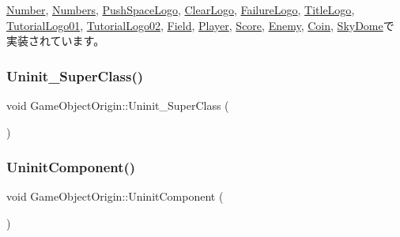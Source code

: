 \mbox{\hyperlink{class_number_a7c3bf9c55f7a0a19d80129c5f07f99f2}{Number}}, \mbox{\hyperlink{class_numbers_aeaad3cc1b8ae7defe79813b983b04101}{Numbers}}, \mbox{\hyperlink{class_push_space_logo_a06404113db417c58941ca7a13bba161e}{Push\+Space\+Logo}}, \mbox{\hyperlink{class_clear_logo_ab55def116615b92a8e8cc40b364b7a4c}{Clear\+Logo}}, \mbox{\hyperlink{class_failure_logo_adbe01fc4567ade0e788f511f5162299c}{Failure\+Logo}}, \mbox{\hyperlink{class_title_logo_a177943b3becc80fcdb7a34f131b07ee9}{Title\+Logo}}, \mbox{\hyperlink{class_tutorial_logo01_aa6fd636ad745d8712ace1c82da285828}{Tutorial\+Logo01}}, \mbox{\hyperlink{class_tutorial_logo02_ab9d0ac3888adf512c29fc0fe7f9beb4e}{Tutorial\+Logo02}}, \mbox{\hyperlink{class_field_a6d1015e2409daa87cd00485ac1efc06b}{Field}}, \mbox{\hyperlink{class_player_a7455a83ac23d2f5e0cce0ddd7d92db0c}{Player}}, \mbox{\hyperlink{class_score_a605e163dc59ccc4d19a3cb6b5db813b8}{Score}}, \mbox{\hyperlink{class_enemy_a9aeaa757abdf0c37fd67c4ce5aed6962}{Enemy}}, \mbox{\hyperlink{class_coin_a4d364dcb4b57b80ea00ce931d0bb300f}{Coin}}, \mbox{\hyperlink{class_sky_dome_a7fc71bfa671cf6e7ab26a194459b0753}{Sky\+Dome}}で実装されています。

\mbox{\label{class_game_object_origin_a788deb7503c9fa090193138cd13247ba}} 
\subsubsection{\texorpdfstring{Uninit\+\_\+\+Super\+Class()}{Uninit\_SuperClass()}}
{\footnotesize\ttfamily void Game\+Object\+Origin\+::\+Uninit\+\_\+\+Super\+Class (\begin{DoxyParamCaption}{ }\end{DoxyParamCaption})\hspace{0.3cm}{\ttfamily [protected]}}

\mbox{\label{class_game_object_origin_a70d7e7923ff9456b0bc7f5f233f49159}} 
\subsubsection{\texorpdfstring{Uninit\+Component()}{UninitComponent()}}
{\footnotesize\ttfamily void Game\+Object\+Origin\+::\+Uninit\+Component (\begin{DoxyParamCaption}{ }\end{DoxyParamCaption})\hspace{0.3cm}{\ttfamily [protected]}}



